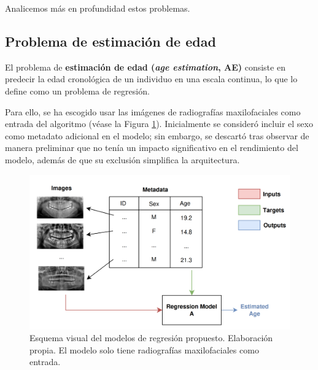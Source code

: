 Analicemos más en profundidad estos problemas.  


\subsection{Problema de estimación de edad}

El problema de \textbf{estimación de edad (\textit{age estimation}, AE)} consiste en predecir la edad 
cronológica de un individuo en una escala continua, lo que lo define como un problema de regresión.

Para ello, se ha escogido usar las imágenes de radiografías maxilofaciales como entrada del algoritmo (véase 
la Figura \ref{fig:regression_problems}).
Inicialmente se consideró incluir el sexo como metadato adicional en el modelo; sin embargo, se descartó 
tras observar de manera preliminar que no tenía un impacto significativo en el rendimiento del modelo, 
además de que su exclusión simplifica la arquitectura.

\begin{figure}[h]
    \centering
    \includegraphics[width=\textwidth]{capitulos/cap_04/imagenes/regression_problem.png}
    \caption[
        Esquema visual del modelos de regresión propuesto. 
        Elaboración propia.
    ]{
        Esquema visual del modelos de regresión propuesto. 
        Elaboración propia.
        El modelo solo tiene radiografías maxilofaciales como entrada. 
    } 
    \label{fig:regression_problems}
\end{figure}



